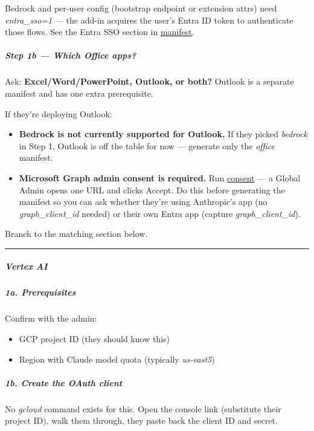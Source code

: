 \documentclass[11pt]{article}
\begin{document}
Bedrock and per-user config (bootstrap endpoint or extension attrs) need \emph{entra\_\allowbreak{}sso=1} — the add-in acquires the user's Entra ID token to authenticate those flows. See the Entra SSO section in \href{manifest.md}{manifest}.


\subparagraph{Step 1b — Which Office apps?}\mbox{}\par

Ask: \textbf{Excel/Word/PowerPoint, Outlook, or both?} Outlook is a separate manifest and has one extra prerequisite.


If they're deploying Outlook:

\begin{itemize}[leftmargin=*,itemsep=2pt,topsep=2pt]
\item {} \textbf{Bedrock is not currently supported for Outlook.} If they picked \emph{bedrock} in Step 1, Outlook is off the table for now — generate only the \emph{office} manifest.
\item {} \textbf{Microsoft Graph admin consent is required.} Run \href{consent.md\#outlook--microsoft-graph-consent}{consent} — a Global Admin opens one URL and clicks Accept. Do this before generating the manifest so you can ask whether they're using Anthropic's app (no \emph{graph\_\allowbreak{}client\_\allowbreak{}id} needed) or their own Entra app (capture \emph{graph\_\allowbreak{}client\_\allowbreak{}id}).
\end{itemize}

Branch to the matching section below.


\vspace{0.5em}\hrule\vspace{0.5em}

\subparagraph{Vertex AI}\mbox{}\par

\subparagraph{1a. Prerequisites}\mbox{}\par

Confirm with the admin:

\begin{itemize}[leftmargin=*,itemsep=2pt,topsep=2pt]
\item {} GCP project ID (they should know this)
\item {} Region with Claude model quota (typically \emph{us-east5})
\end{itemize}

\subparagraph{1b. Create the OAuth client}\mbox{}\par

No \emph{gcloud} command exists for this. Open the console link (substitute their project ID), walk them through, they paste back the client ID and secret.
\end{document}
